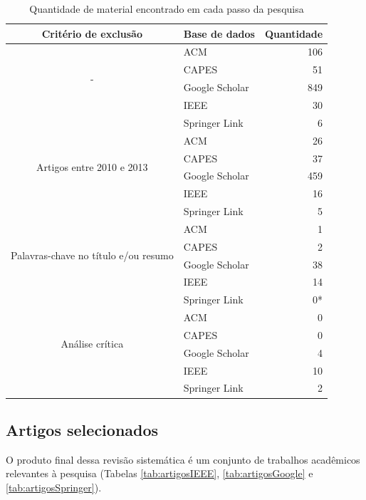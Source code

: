 \begin{table}[H]
	\centering
	\begin{tabular}{| c | l | r |} \hline \textbf{Critério de exclusão} & \textbf{Base de dados}  & \textbf{Quantidade} \\ \hline
		\multirow{4}{*}{-}
			& ACM & 106 \\ \cline{2-3}
			& CAPES & 51 \\ \cline{2-3}
			& Google Scholar & 849 \\ \cline{2-3}
			& IEEE & 30 \\ \cline{2-3}
			& Springer Link & 6 \\ \cline{2-3}
		\hline \hline
		\multirow{4}{*}{Artigos entre 2010 e 2013} 
			& ACM & 26 \\ \cline{2-3}
			& CAPES & 37 \\ \cline{2-3}
			& Google Scholar & 459 \\ \cline{2-3}
			& IEEE & 16 \\ \cline{2-3}
			& Springer Link & 5 \\ \cline{2-3}
		\hline \hline
		\multirow{4}{*}{Palavras-chave no título e/ou resumo} 
			& ACM & 1 \\ \cline{2-3}
			& CAPES & 2 \\ \cline{2-3}
			& Google Scholar & 38 \\ \cline{2-3}
			& IEEE & 14 \\ \cline{2-3}
			& Springer Link & 0* \\ \cline{2-3}
		\hline \hline
		\multirow{4}{*}{Análise crítica}
			& ACM & 0 \\ \cline{2-3}
			& CAPES & 0 \\ \cline{2-3}
			& Google Scholar & 4 \\ \cline{2-3}
			& IEEE & 10 \\ \cline{2-3}
			& Springer Link & 2 \\ \cline{2-3}
		\hline
	\end{tabular}
	\captionsetup{justification=centering}
	\caption{Quantidade de material encontrado em cada passo da pesquisa}
	\label{tab:quantidadeDeMateriais}
\end{table}

\subsection{Artigos selecionados}

O produto final dessa revisão sistemática é um conjunto de trabalhos acadêmicos relevantes à pesquisa (Tabelas \ref{tab:artigosIEEE}, \ref{tab:artigosGoogle} e \ref{tab:artigosSpringer}).

